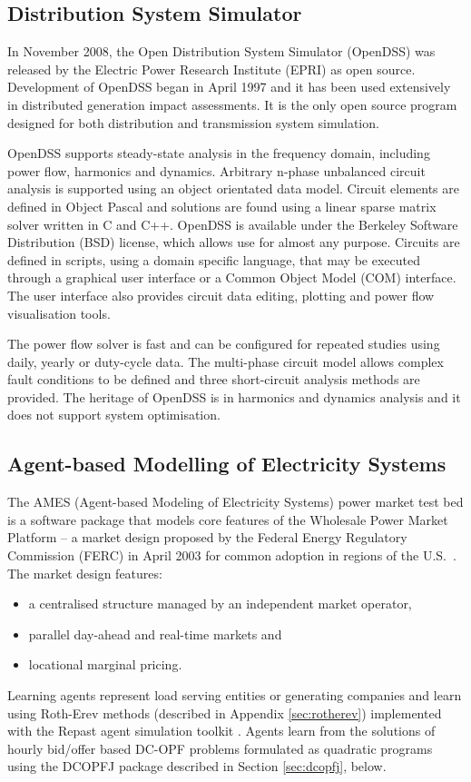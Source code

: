 \subsection*{Distribution System Simulator}
In November 2008, the Open Distribution System Simulator (OpenDSS) was released
by the Electric Power Research Institute (EPRI) as open source.  Development of
OpenDSS began in April 1997 and it has been used extensively in distributed
generation impact assessments.  It is the only open source
program designed for both distribution and transmission system simulation.

OpenDSS supports steady-state analysis in the frequency domain, including power
flow, harmonics and dynamics.  Arbitrary n-phase unbalanced circuit analysis is supported using an object orientated data model.  Circuit elements are defined in Object Pascal
and solutions are found using a linear sparse matrix solver written in C and
C++.  OpenDSS is available under the Berkeley Software Distribution (BSD)
license, which allows use for almost any purpose.  Circuits are defined in
scripts, using a domain specific language, that may be executed through a
graphical user interface or a Common Object Model (COM) interface.  The user
interface also provides circuit data editing, plotting and power flow
visualisation tools.

The power flow solver is fast and can be configured for repeated
studies using daily, yearly or duty-cycle data.  The multi-phase circuit model allows
complex fault conditions to be defined and three short-circuit analysis methods
are provided.  The heritage of OpenDSS is in harmonics and dynamics analysis
and it does not support system optimisation.

\subsection*{Agent-based Modelling of Electricity Systems}
\label{sec:ames}
The AMES (Agent-based Modeling of Electricity Systems) power market test bed is
a software package that models core features of the Wholesale Power Market
Platform -- a market design proposed by the Federal Energy Regulatory
Commission (FERC) in April 2003 for common adoption in regions of the
U.S.~\cite{tesfatsi:wpmp}. The market design features:
\begin{itemize}
  \item a centralised structure managed by an independent market operator,
  \item parallel day-ahead and real-time markets and
  \item locational marginal pricing.
\end{itemize}
Learning agents represent load serving entities or generating companies and
learn using Roth-Erev methods (described in Appendix \ref{sec:rotherev})
implemented with the Repast agent simulation toolkit \cite{gieseler:thesis}.
Agents learn from the solutions of hourly bid/offer based
DC-OPF problems formulated as quadratic programs using the DCOPFJ package
\cite{tesfatsi:dcopf} described in Section \ref{sec:dcopfj}, below.


